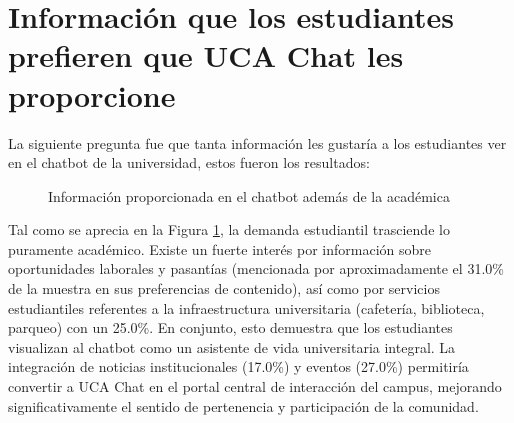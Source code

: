{{\section{Información que los estudiantes prefieren que UCA Chat les proporcione}
La siguiente pregunta fue que tanta información les gustaría a los estudiantes ver en el chatbot de la universidad, estos fueron los resultados:

\begin{figure}[H]
    \centering
    \caption{Información proporcionada en el chatbot además de la académica}
    \label{fig:info_adicional_chatbot}
\end{figure}

Tal como se aprecia en la Figura \ref{fig:info_adicional_chatbot}, la demanda estudiantil trasciende lo puramente académico. Existe un fuerte interés por información sobre oportunidades laborales y pasantías (mencionada por aproximadamente el 31.0\% de la muestra en sus preferencias de contenido), así como por servicios estudiantiles referentes a la infraestructura universitaria (cafetería, biblioteca, parqueo) con un 25.0\%. En conjunto, esto demuestra que los estudiantes visualizan al chatbot como un asistente de vida universitaria integral. La integración de noticias institucionales (17.0\%) y eventos (27.0\%) permitiría convertir a UCA Chat en el portal central de interacción del campus, mejorando significativamente el sentido de pertenencia y participación de la comunidad.

}}

